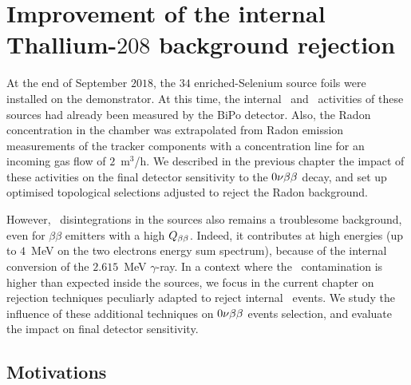 \chapter{Improvement of the internal Thallium-$208$ background rejection}
\label{ch:timediff}

At the end of September $2018$, the $34$ enriched-Selenium source foils were installed on the demonstrator.
At this time, the internal \Tl\ and \Bi\ activities of these sources had already been measured by the BiPo detector.
Also, the Radon concentration in the chamber was extrapolated from Radon emission measurements of the tracker components with a concentration line for an incoming gas flow of $2$~m$^{3}$/h.
We described in the previous chapter the impact of these activities on the final detector sensitivity to the $0\nu\beta\beta$ decay, and set up optimised topological selections adjusted to reject the Radon background.

However, \Tl\ disintegrations in the sources also remains a troublesome background, even for $\beta\beta$ emitters with a high $Q_{\beta\beta}$.
Indeed, it contributes at high energies (up to $4$~MeV on the two electrons energy sum spectrum), because of the internal conversion of the $2.615$~MeV $\gamma$-ray.
In a context where the \Tl\ contamination is higher than expected inside the sources, we focus in the current chapter on rejection techniques peculiarly adapted to reject internal \Tl\ events.
We study the influence of these additional techniques on $0\nu\beta\beta$ events selection, and evaluate the impact on final detector sensitivity.

\section{Motivations}

